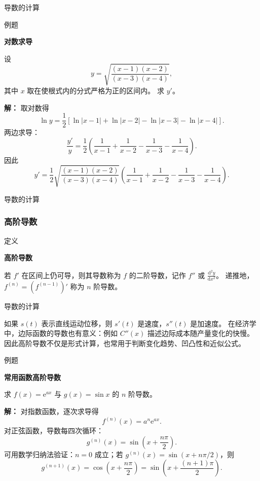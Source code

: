 \documentclass[aspectratio=169,10pt,fontset=fandol]{ctexbeamer}
\newcommand{\dd}{\mathrm{d}}
\newcommand{\ee}{\mathrm{e}}
\begin{document}
\begin{frame}[t,fragile]{导数的计算}
\small
\begin{block}{例题}
{\small
\textbf{对数求导}\par

	设
	\[
	y=\sqrt{\frac{(x-1)(x-2)}{(x-3)(x-4)}},
	\]
	其中 $x$ 取在使根式内的分式严格为正的区间内。 求 $y'$。

}
\end{block}
\pause
{\small
\textbf{解：}
取对数得
	\[
	\ln y=\frac12\left[\ln|x-1|+\ln|x-2|-\ln|x-3|-\ln|x-4|\right].
	\]
	两边求导：
	\[
	\frac{y'}{y}
	=\frac12\left(\frac1{x-1}+\frac1{x-2}-\frac1{x-3}-\frac1{x-4}\right).
	\]
	因此
	\[
	y'=\frac12\sqrt{\frac{(x-1)(x-2)}{(x-3)(x-4)}}
	\left(\frac1{x-1}+\frac1{x-2}-\frac1{x-3}-\frac1{x-4}\right).
	\]

}
\end{frame}
\begin{frame}[t,fragile]{导数的计算}
\normalsize
{\normalsize

\subsubsection*{高阶导数}


}
\begin{block}{定义}
{\normalsize
\textbf{高阶导数}\par

若 $f'$ 在区间上仍可导，则其导数称为 $f$ 的二阶导数，记作 $f''$ 或 $\frac{\dd^2y}{\dd x^2}$。 递推地，$f^{(n)}=(f^{(n-1)})'$ 称为 $n$ 阶导数。

}
\end{block}
\end{frame}
\begin{frame}[t,fragile]{导数的计算}
\small
{\small
如果 $s(t)$ 表示直线运动位移，则 $s'(t)$ 是速度，$s''(t)$ 是加速度。 在经济学中，边际函数的导数也有意义：例如 $C''(x)$ 描述边际成本随产量变化的快慢。 因此高阶导数不仅是形式计算，也常用于判断变化趋势、凹凸性和近似公式。


}
\begin{block}{例题}
{\small
\textbf{常用函数高阶导数}\par

求 $f(x)=\ee^{ax}$ 与 $g(x)=\sin x$ 的 $n$ 阶导数。

}
\end{block}
\pause
{\small
\textbf{解：}
对指数函数，逐次求导得
\[
f^{(n)}(x)=a^n\ee^{ax}.
\]
对正弦函数，导数每四次循环：
\[
g^{(n)}(x)=\sin\left(x+\frac{n\pi}{2}\right).
\]
可用数学归纳法验证：$n=0$ 成立；若 $g^{(n)}(x)=\sin(x+n\pi/2)$，则
\[
g^{(n+1)}(x)=\cos\left(x+\frac{n\pi}{2}\right)=\sin\left(x+\frac{(n+1)\pi}{2}\right).
\]

}
\end{frame}
\end{document}
